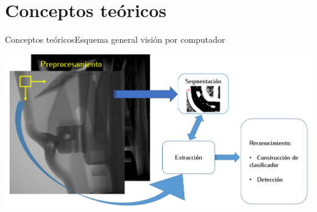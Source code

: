 \documentclass[10pt]{beamer}
\begin{document}
\section{Conceptos teóricos}

\begin{frame}{Conceptos teóricos}{Esquema general visión por computador}

{\centering \includegraphics[scale=0.32]{AAUgraphics/proceso.png}\par}

\end{frame}
\end{document}
